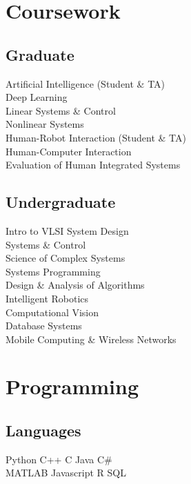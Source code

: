 \documentclass[]{deedy-resume}
\begin{document}
\begin{minipage}[t]{0.33\textwidth}

\section{Coursework}
\subsection{Graduate}
Artificial Intelligence {\scriptsize (Student \& TA)} \\
Deep Learning \\
Linear Systems \& Control \\
Nonlinear Systems \\
Human-Robot Interaction {\scriptsize (Student \& TA)} \\
Human-Computer Interaction \\
Evaluation of Human Integrated Systems \\
\sectionsep

\subsection{Undergraduate}
Intro to VLSI System Design \\
Systems \& Control \\
Science of Complex Systems \\
Systems Programming \\
Design \& Analysis of Algorithms \\
Intelligent Robotics \\
Computational Vision \\
Database Systems \\
Mobile Computing \& Wireless Networks \\


\section{Programming}
\subsection{Languages}
Python \textbullet{} C++ \textbullet{} C \textbullet{} Java \textbullet{} C\# \\
MATLAB \textbullet{} Javascript \textbullet{} R \textbullet{} SQL
\sectionsep


\end{minipage}
\end{document}
